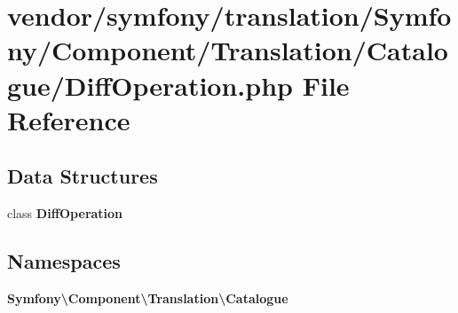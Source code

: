 \section{vendor/symfony/translation/\+Symfony/\+Component/\+Translation/\+Catalogue/\+Diff\+Operation.php File Reference}
\label{_diff_operation_8php}
\subsection*{Data Structures}
\begin{DoxyCompactItemize}
\item 
class {\bf Diff\+Operation}
\end{DoxyCompactItemize}
\subsection*{Namespaces}
\begin{DoxyCompactItemize}
\item 
 {\bf Symfony\textbackslash{}\+Component\textbackslash{}\+Translation\textbackslash{}\+Catalogue}
\end{DoxyCompactItemize}
